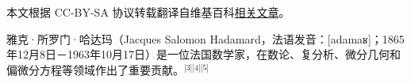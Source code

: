 
本文根据 CC-BY-SA 协议转载翻译自维基百科\href{https://en.wikipedia.org/wiki/Jacques_Hadamard}{相关文章}。

雅克·所罗门·哈达玛（Jacques Salomon Hadamard，法语发音：[adamaʁ]；1865年12月8日－1963年10月17日）是一位法国数学家，在数论、复分析、微分几何和偏微分方程等领域作出了重要贡献。\(^\text{[3][4][5]}\)
